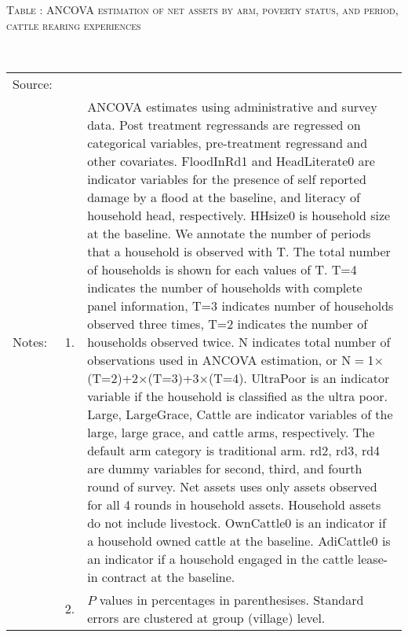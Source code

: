 \vspace{-1cm}\hspace{-1cm}\begin{minipage}[t]{14cm}
\hfil\textsc{\normalsize Table \thetable: ANCOVA estimation of net assets by arm, poverty status, and period, cattle rearing experiences\label{tab ANCOVA narrow net assets Experience timevarying poverty status}}\\
\setlength{\tabcolsep}{1pt}
\setlength{\baselineskip}{8pt}
\renewcommand{\arraystretch}{.52}
\hfil{}\\
\renewcommand{\arraystretch}{.8}
\setlength{\tabcolsep}{1pt}
\begin{tabular}{>{\hfill\scriptsize}p{1cm}<{}>{\hfill\scriptsize}p{.25cm}<{}>{\scriptsize}p{12cm}<{\hfill}}
Source:& \multicolumn{2}{l}{\scriptsize Estimated with GUK administrative and survey data.}\\
Notes: & 1. & ANCOVA estimates using administrative and survey data. Post treatment regressands are regressed on categorical variables, pre-treatment regressand and other covariates. \textsf{FloodInRd1} and \textsf{HeadLiterate0} are indicator variables for the presence of self reported damage by a flood at the baseline, and literacy of household head, respectively. \textsf{HHsize0} is household size at the baseline. We annotate the number of periods that a household is observed with \textsf{T}. The total number of households is shown for each values of \textsf{T}. \textsf{T=4} indicates the number of households with complete panel information, \textsf{T=3} indicates number of households observed three times, \textsf{T=2} indicates the number of households observed twice. \textsf{N} indicates total number of observations used in ANCOVA estimation, or \textsf{N$=$1$\times$(T=2)+2$\times$(T=3)+3$\times$(T=4)}.  \textsf{UltraPoor} is an indicator variable if the household is classified as the ultra poor. \textsf{Large}, \textsf{LargeGrace}, \textsf{Cattle} are indicator variables of the \textsf{large}, \textsf{large grace}, and \textsf{cattle} arms, respectively. The default arm category is \textsf{traditional} arm. \textsf{rd2, rd3, rd4} are dummy variables for second, third, and fourth round of survey. Net assets uses only assets observed for all 4 rounds in household assets. Household assets do not include livestock. \textsf{OwnCattle0} is an indicator if a household owned cattle at the baseline. \textsf{AdiCattle0} is an indicator if a household engaged in the cattle lease-in contract at the baseline.  \\
& 2. & $P$ values in percentages in parenthesises. Standard errors are clustered at group (village) level.
\end{tabular}
\end{minipage}

